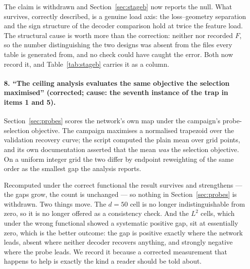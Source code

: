 The claim is withdrawn and Section~\ref{sec:stageb} now reports the null. What survives, correctly
described, is a genuine load axis: the loss--geometry separation and the sign structure of the
decoder comparison hold at twice the feature load. The structural cause is worth more than the
correction: neither  nor  recorded
$F$, so the number distinguishing the two designs was absent from the files every table is generated
from, and no check could have caught the error. Both now record it, and Table~\ref{tab:stageb} carries
it as a column.

\paragraph{8. ``The ceiling analysis evaluates the same objective the selection maximised''
(corrected; cause: the seventh instance of the trap in items 1 and 5).} Section~\ref{sec:probes}
scores the network's own map under the campaign's probe-selection objective. The campaign maximises a
normalised trapezoid over the validation recovery curve; the script computed the plain mean over grid
points, and its own documentation asserted that the mean \emph{was} the selection objective. On a
uniform integer grid the two differ by endpoint reweighting of the same order as the smallest gap the
analysis reports.

Recomputed under the correct functional the result survives and strengthens --- the gaps grow, the
count is unchanged --- so nothing in Section~\ref{sec:probes} is withdrawn. Two things move. The
$d=50$ cell is no longer indistinguishable from zero, so it is no longer offered as a consistency
check. And the $L^2$ cells, which under the wrong functional showed a systematic positive gap, sit at
essentially zero, which is the better outcome: the gap is positive exactly where the network leads,
absent where neither decoder recovers anything, and strongly negative where the probe leads. We
record it because a corrected measurement that happens to help is exactly the kind a reader should be
told about.

